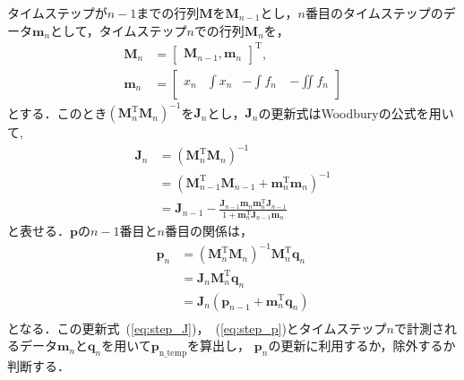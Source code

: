 \documentclass[a4paper]{jarticle}
\begin{document}
タイムステップが$n-1$までの行列$\mathbf{M}$を$\mathbf{M}_{n-1}$とし，$n$番目のタイムステップのデータ$\mathbf{m}_n$として，タイムステップ$n$での行列$\mathbf{M}_n$を，
\begin{equation}
    \begin{aligned}
        \mathbf{M}_n &= \begin{bmatrix}
            \mathbf{M}_{n-1} ,\mathbf{m}_n
        \end{bmatrix}^{\mathrm{T}},\\
        \mathbf{m}_{n}&=\begin{bmatrix}
            x_{n} & \int{x_{n}} & -\int{f_{n}}\ & -\iint{f_{n}}\\
        \end{bmatrix}
    \end{aligned}
\end{equation}
とする．このとき$(\mathbf{M}_{n}^{\mathrm{T}}\mathbf{M}_{n})^{-1}$を$\mathbf{J}_{n}$とし，$\mathbf{J}_{n}$の更新式はWoodburyの公式を用いて,
\begin{equation}
    \begin{aligned}
    \mathbf{J}_n &= (\mathbf{M}_{n}^{\mathrm{T}}\mathbf{M}_{n})^{-1}\\
                 &= (\mathbf{M}_{n-1}^{\mathrm{T}}\mathbf{M}_{n-1} + \mathbf{m}_{n}^{\mathrm{T}}\mathbf{m}_{n})^{-1}\\
                 &= \mathbf{J}_{n-1} - \frac{\mathbf{J}_{n-1}\mathbf{m}_{n}\mathbf{m}_{n}^{\mathrm{T}}\mathbf{J}_{n-1}}{1+\mathbf{m}_{n}^{\mathrm{T}}\mathbf{J}_{n-1}\mathbf{m}_{n}}
    \end{aligned}
    \label{eq:step_J}
\end{equation}
と表せる．$\mathbf{p}$の$n-1$番目と$n$番目の関係は，
\begin{equation}
    \begin{aligned}
    \mathbf{p}_n &= (\mathbf{M}_{n}^{\mathrm{T}}\mathbf{M}_{n})^{-1}\mathbf{M}_{n}^{\mathrm{T}}\mathbf{q}_{n}\\
                 &= \mathbf{J}_{n}\mathbf{M}_{n}^{\mathrm{T}}\mathbf{q}_{n}\\
                 &= \mathbf{J}_{n}(\mathbf{p}_{n-1}+\mathbf{m}_{n}^{\mathrm{T}}\mathbf{q}_{n})\\
    \end{aligned}
    \label{eq:step_p}
\end{equation}
となる．この更新式~(\ref{eq:step_J})，~(\ref{eq:step_p})とタイムステップ$n$で計測されるデータ$\mathbf{m}_{n}$と$\mathbf{q}_{n}$を用いて$\mathbf{p}_{\mathrm{n\_temp}}$を算出し，
$\mathbf{p}_{n}$の更新に利用するか，除外するか判断する．
\end{document}
